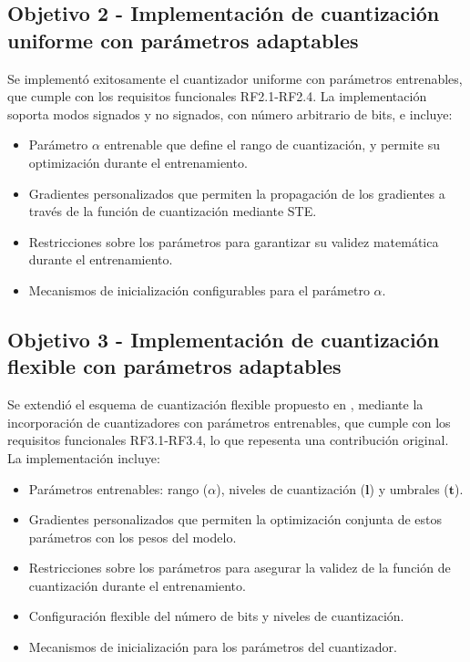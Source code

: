 \subsection{Objetivo 2 - Implementación de cuantización uniforme con parámetros adaptables}

Se implementó exitosamente el cuantizador uniforme con parámetros entrenables, que cumple con los requisitos funcionales RF2.1-RF2.4. La implementación soporta modos signados y no signados, con número arbitrario de bits, e incluye:

\begin{itemize}
    \item Parámetro $\alpha$ entrenable que define el rango de cuantización, y permite su optimización durante el entrenamiento.
    \item Gradientes personalizados que permiten la propagación de los gradientes a través de la función de cuantización mediante STE.
    \item Restricciones sobre los parámetros para garantizar su validez matemática durante el entrenamiento.
    \item Mecanismos de inicialización configurables para el parámetro $\alpha$.
\end{itemize}

\subsection{Objetivo 3 - Implementación de cuantización flexible con parámetros adaptables}

Se extendió el esquema de cuantización flexible propuesto en \cite{electronics13101923}, mediante la incorporación de cuantizadores con parámetros entrenables, que cumple con los requisitos funcionales RF3.1-RF3.4, lo que repesenta una contribución original. La implementación incluye:

\begin{itemize}
    \item Parámetros entrenables: rango ($\alpha$), niveles de cuantización ($\mathbf{l}$) y umbrales ($\mathbf{t}$).
    \item Gradientes personalizados que permiten la optimización conjunta de estos parámetros con los pesos del modelo.
    \item Restricciones sobre los parámetros para asegurar la validez de la función de cuantización durante el entrenamiento.
    \item Configuración flexible del número de bits y niveles de cuantización.
    \item Mecanismos de inicialización para los parámetros del cuantizador.
\end{itemize}

